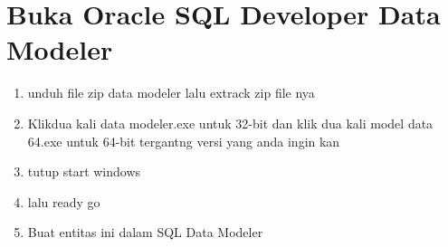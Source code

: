 \documentclass{article}
\begin{document}
\section{Buka Oracle SQL Developer Data Modeler }
\begin{enumerate}

\item   unduh file zip data modeler lalu extrack zip file nya
\item	Klikdua kali data modeler.exe untuk 32-bit dan klik dua kali model data 64.exe untuk 64-bit tergantng versi yang anda ingin kan
\item tutup start windows
\item lalu ready go
\item Buat entitas ini dalam SQL Data Modeler
\end{enumerate}
\end{document}
